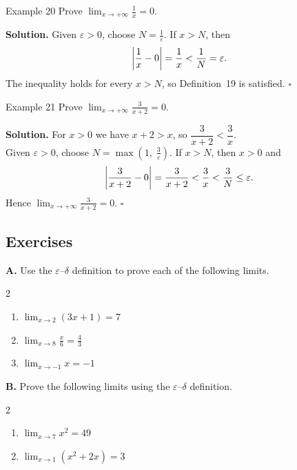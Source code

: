 \begin{examplebox}{Example 20}
Prove \(\displaystyle\lim_{x \to +\infty} \frac{1}{x} = 0\).

\medskip
\textbf{Solution.}
Given \(\varepsilon > 0\), choose \(N = \frac{1}{\varepsilon}\). If \(x > N\), then
\[
\left|\frac{1}{x} - 0\right| = \frac{1}{x} < \frac{1}{N} = \varepsilon.
\]
The inequality holds for every \(x > N\), so Definition~19 is satisfied. \(\square\)
\end{examplebox}

\begin{examplebox}{Example 21}
Prove \(\displaystyle\lim_{x \to +\infty} \frac{3}{x+2} = 0\).

\medskip
\textbf{Solution.}
For \(x > 0\) we have \(x + 2 > x\), so
\(\dfrac{3}{x+2} < \dfrac{3}{x}.\) \\
Given \(\varepsilon > 0\), choose \(N = \max\!\left(1,\; \frac{3}{\varepsilon}\right)\). If \(x > N\), then \(x > 0\) and
\[
\left|\frac{3}{x+2} - 0\right| = \frac{3}{x+2} < \frac{3}{x} < \frac{3}{N} \le \varepsilon.
\]
Hence \(\displaystyle\lim_{x \to +\infty} \frac{3}{x+2} = 0\). \(\square\)
\end{examplebox}

\subsection*{Exercises}
\label{subsec:1.4.7}

\raggedcolumns
\setlength{\columnsep}{1.5em}

\medskip
\noindent\textbf{A.} Use the \(\varepsilon\)--\(\delta\) definition to prove each of the following limits.

\begin{multicols}{2}
\begin{enumerate}[label=\arabic*., nosep, topsep=0pt, itemsep=2pt]
    \item \(\lim_{x \to 2} (3x + 1) = 7\)
    \item \(\lim_{x \to 8} \frac{x}{6} = \frac{4}{3}\)
    \item \(\lim_{x \to -1} x = -1\)
\end{enumerate}
\end{multicols}

\medskip
\noindent\textbf{B.} Prove the following limits using the \(\varepsilon\)--\(\delta\) definition.

\begin{multicols}{2}
\begin{enumerate}[label=\arabic*., start=4, nosep, topsep=0pt, itemsep=2pt]
    \item \(\lim_{x \to 7} x^{2} = 49\)
    \item \(\lim_{x \to 1} (x^{2} + 2x) = 3\)
\end{enumerate}
\end{multicols}

